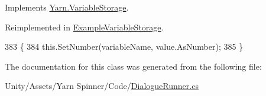 Implements \hyperlink{a00088_aa90ff61224432c5ed3ce72199c55f440}{Yarn.\-Variable\-Storage}.



Reimplemented in \hyperlink{a00033_ac4265c1c9da485f13a6b05784b0f668d}{Example\-Variable\-Storage}.


\begin{DoxyCode}
383                                                                        \{
384             this.SetNumber(variableName, value.AsNumber);
385         \}
\end{DoxyCode}


The documentation for this class was generated from the following file\-:\begin{DoxyCompactItemize}
\item 
Unity/\-Assets/\-Yarn Spinner/\-Code/\hyperlink{a00105}{Dialogue\-Runner.\-cs}\end{DoxyCompactItemize}

